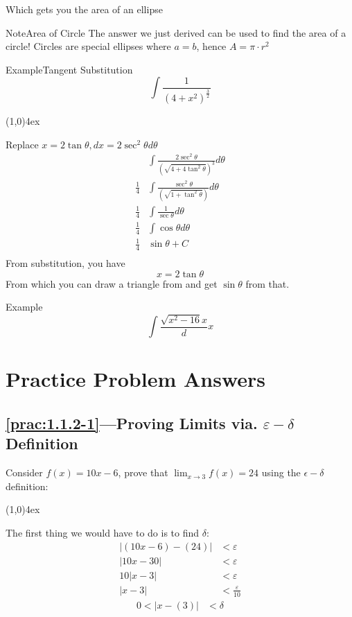 \documentclass{MathNotes}
\newenvironment{example}[1]{\begin{BlueBox}{Example}{#1}}{\end{BlueBox}}
\newenvironment{note}[1]{\begin{YellowBox}{Note}{#1}}{\end{YellowBox}}
\newcommand{\br}{
	\begin{center}
		\line(1,0){4ex}
	\end{center}}
\begin{document}
Which gets you the area of an ellipse

\begin{note}{Area of Circle}
	The answer we just derived can be used to find the area of a circle!
	Circles are special ellipses where $a=b$, hence $A=\pi\cdot r^2$
\end{note}

\begin{example}{Tangent Substitution}
	\[\int\frac{1}{\left(4+x^2\right)^\frac{3}{2}}\]
	\br
	Replace $x=2\tan\theta,dx=2\sec^2\theta d\theta$
	\begin{align*}
		            & \int\frac{2\sec^2\theta}{\left(\sqrt{4+4\tan^2\theta}\right)^3}d\theta \\
		\frac{1}{4} & \int\frac{\sec^2\theta}{\left(\sqrt{1+\tan^2\theta}\right)}d\theta     \\
		\frac{1}{4} & \int\frac{1}{\sec\theta}d\theta                                        \\
		\frac{1}{4} & \int\cos\theta d\theta                                                 \\
		\frac{1}{4} & \sin\theta+C                                                           \\
	\end{align*}
	From substitution, you have
	\[x=2\tan\theta\]
	From which you can draw a triangle from and get $\sin\theta$ from that.
\end{example}

\begin{example}{}
	\[\int\frac{\sqrt{x^2-16}{x}}dx\]
\end{example}

\newpage
\section{Practice Problem Answers}

\subsection*{\ref{prac:1.1.2-1}---Proving Limits via. $\varepsilon-\delta$ Definition}
\label{ans:1.1.2-1}
Consider $f(x)=10x-6$, prove that $\displaystyle\lim_{x\to 3}f(x)=24$ using the
$\epsilon-\delta$ definition:
\br
The first thing we would have to do is to find $\delta$:
\begin{align*}
	\lvert (10x-6)-(24) \rvert & <\varepsilon            \\
	\lvert 10x-30 \rvert       & <\varepsilon            \\
	10\lvert x-3 \rvert        & <\varepsilon            \\
	\lvert x-3 \rvert          & <\frac{\varepsilon}{10}
\end{align*}
\begin{align*}
	0 < \lvert x - (3)\rvert & < \delta
\end{align*}
\end{document}
